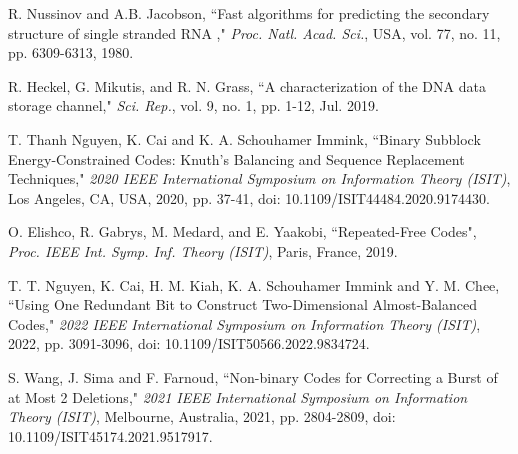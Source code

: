 \documentclass[conference]{IEEEtran}
\theoremstyle{plain}
\theoremstyle{definition}
\begin{document}
\begin{thebibliography}{99}
  R. Nussinov and A.B. Jacobson, ``Fast algorithms for predicting the secondary structure of single stranded RNA ," {\em Proc. Natl. Acad. Sci.}, USA, vol. 77, no. 11, pp. 6309-6313, 1980.

  R. Heckel, G. Mikutis, and R. N. Grass, ``A characterization of the DNA data storage channel," {\em Sci. Rep.}, vol. 9, no. 1, pp. 1-12, Jul. 2019.

 T. Thanh Nguyen, K. Cai and K. A. Schouhamer Immink, ``Binary Subblock Energy-Constrained Codes: Knuth's Balancing and Sequence Replacement Techniques," {\em 2020 IEEE International Symposium on Information Theory (ISIT)}, Los Angeles, CA, USA, 2020, pp. 37-41, doi: 10.1109/ISIT44484.2020.9174430. 


 O. Elishco, R. Gabrys, M. Medard, and E. Yaakobi, ``Repeated-Free Codes", {\em Proc. IEEE Int. Symp. Inf. Theory (ISIT)}, Paris, France, 2019.

 T. T. Nguyen, K. Cai, H. M. Kiah, K. A. Schouhamer Immink and Y. M. Chee, ``Using One Redundant Bit to Construct Two-Dimensional Almost-Balanced Codes," {\em 2022 IEEE International Symposium on Information Theory (ISIT)}, 2022, pp. 3091-3096, doi: 10.1109/ISIT50566.2022.9834724.


 S. Wang, J. Sima and F. Farnoud, ``Non-binary Codes for Correcting a Burst of at Most 2 Deletions," {\em 2021 IEEE International Symposium on Information Theory (ISIT)}, Melbourne, Australia, 2021, pp. 2804-2809, doi: 10.1109/ISIT45174.2021.9517917.

\end{thebibliography}
\end{document}
